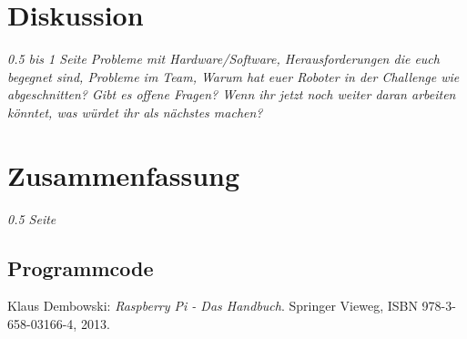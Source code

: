\documentclass[12pt,a4paper,oneside]{article}
\begin{document}
\begin{spacing}{1.15}
	\section{Diskussion}
	\textit{0.5 bis 1 Seite}
	\textit{Probleme mit Hardware/Software, Herausforderungen die euch begegnet sind, Probleme im Team, Warum hat euer Roboter in der Challenge wie abgeschnitten? Gibt es offene Fragen? Wenn ihr jetzt noch weiter daran arbeiten könntet, was würdet ihr als nächstes machen?}
	
	\section{Zusammenfassung}
	\textit{0.5 Seite}
	
	
	\clearpage  
	\begin{appendix}
	\section{Programmcode}
	\end{appendix}
    \clearpage  
    \begin{thebibliography}{50}
   		 Klaus Dembowski: \textit{Raspberry Pi - Das Handbuch}. Springer Vieweg, ISBN 978-3-658-03166-4, 2013.
	\end{thebibliography}

\end{spacing}
\end{document}
